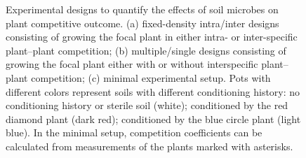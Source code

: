 \clearpage
\begin{figure}[h!]
	\centering
	\caption[Experimental designs to quantify the effects of soil microbes on plant competitive outcome.]
		{\hspace{1mm}Experimental designs to quantify the effects of soil microbes on plant competitive outcome. (a) fixed-density intra/inter designs consisting of growing the focal plant in either intra- or inter-specific plant--plant competition; (b) multiple/single designs consisting of growing the focal plant either with or without interspecific plant--plant competition; (c) minimal experimental setup. Pots with different colors represent soils with different conditioning history: no conditioning history or sterile soil (white); conditioned by the red diamond plant (dark red); conditioned by the blue circle plant (light blue). In the minimal setup, competition coefficients can be calculated from measurements of the plants marked with asterisks.}
	\label{fig:ExperimentSetup}
\end{figure}




